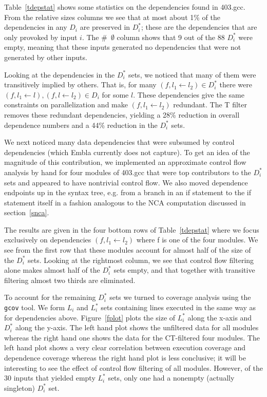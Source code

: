 \documentclass[times, 10pt,twocolumn]{article}
\begin{document}
Table~\ref{tdepstat} shows some statistics on the dependencies found
in 403.gcc. From the relative sizes columns we see that at most about 1\% of the 
dependencies in any $D_i$ are preserved in $D_i^{\ast}$; these are the dependencies 
that are only provoked by input $i$. The \#~$\emptyset$ column shows that 9 out of the
88 $D_i^{\ast}$ were empty, meaning that these inputs generated no dependencies
that were not generated by other inputs.

Looking at the dependencies in the $D_i^{\ast}$ sets, we noticed that many of them were 
transitively implied by others. That is, for many $(f, l_1 \leftarrow l_2) 
\in D_i^{\ast}$ there were $(f, l_1 \leftarrow l), (f, l \leftarrow l_2) \in D_i$ for some $l$.
These dependencies give the same constraints on parallelization and make $(f, l_1 \leftarrow l_2)$
redundant. The T filter removes these redundant dependencies, yielding a 28\% reduction in 
overall dependence numbers and a 44\% reduction in the $D_i^{\ast}$ sets.

We next noticed many data dependencies that were subsumed by control
dependencies (which Embla currently does not capture). To get an idea
of the magnitude of this contribution, we implemented an approximate
control flow analysis by hand for four modules of 403.gcc that were
top contributors to the $D_i^{\ast}$ sets and appeared to have
nontrivial control flow. We also moved dependence endpoints up in the
syntax tree, e.g. from a branch in an if statement to the if statement
itself in a fashion analogous to the NCA computation discussed in
section~\ref{snca}.

The results are given in the four bottom rows of Table~\ref{tdepstat}
where we focus exclusively on dependencies $(f,l_1 \leftarrow l_2)$ where f is
one of the four modules. We see from the first row that these modules
account for almost half of the size of the $D_i^{\ast}$ sets. Looking
at the rightmost column, we see that control flow filtering alone makes
almost half of the $D_i^{\ast}$ sets empty, and that together with
transitive filtering almost two thirds are eliminated.


\begin{figure*}
 
\caption{Coverage deltas (x-axis) versus dependence deltas (y-axis)
for no (left) or CT filtering} \label{fplot}
\end{figure*}

To account for the remaining $D_i^{\ast}$ sets we turned to coverage
analysis using the {\tt gcov} tool. We form $L_i$ and $L_i^{\ast}$
sets containing lines executed in the same way as for dependencies
above. Figure~\ref{fplot} plots the size of $L_i^{\ast}$ along the
x-axis and $D_i^{\ast}$ along the y-axis. The left hand plot shows the
unfiltered data for all modules whereas the right hand one shows the
data for the CT-filtered four modules. The left hand plot shows a very
clear correlation between execution coverage and dependence
coverage whereas the right hand plot is less conclusive; it will be
interesting to see the effect of control flow filtering of all
modules. However, of the 30 inputs that yielded empty $L_i^{\ast}$ sets, only one
had a nonempty (actually singleton) $D_i^{\ast}$ set.
\end{document}
